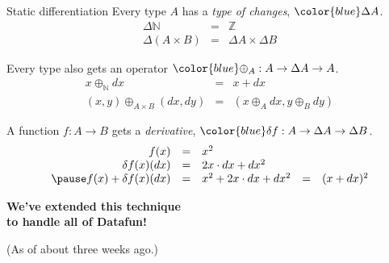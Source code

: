 \documentclass[xcolor=table,usenames,dvipsnames,svgnames]{beamer}
\newcommand{\N}{\mathbb{N}}
\newcommand{\x}{\times}
\newcommand{\GD}{\Delta}
\begin{document}

\begin{frame}{Static differentiation}\large
  \vspace{-1em}
  Every type $A$ has a \emph{type of changes}, $\color{blue}\Delta A$.
  \pause
  \begin{eqnarray*}
    \GD \mathbb{N} &=& \mathbb{Z}\\
    \GD (A \x B) &=& \GD A \x \GD B
  \end{eqnarray*}

  \pause Every type also gets an operator $\color{blue}\oplus_A : A \to \GD A \to A$.
  \pause
  \begin{eqnarray*}
    x \oplus_\N dx &=& x + dx\\
    (x,y) \oplus_{A \x B} (dx,dy) &=& (x \oplus_A dx, y \oplus_B dy)
  \end{eqnarray*}

  \pause A function $f : A \to B$ gets a \emph{derivative},
  $\color{blue} \delta f : A \to \Delta A \to \Delta B$.
  \pause
  $$\begin{array}{rclcl}
    f(x) &=& x^2\\
    \delta f(x)(dx) &=& 2x\cdot dx+dx^2\\
    \pause
    f(x) + \delta f(x)(dx) &=& x^2 + 2x\cdot dx + dx^2 &=& (x + dx)^2
  \end{array}$$



\end{frame}


\begin{frame}\centering\LARGE
  \textbf{We've extended this technique\\ to handle all of Datafun!}

  \vspace{1em}\small (As of about three weeks ago.)

\end{frame}
\end{document}
